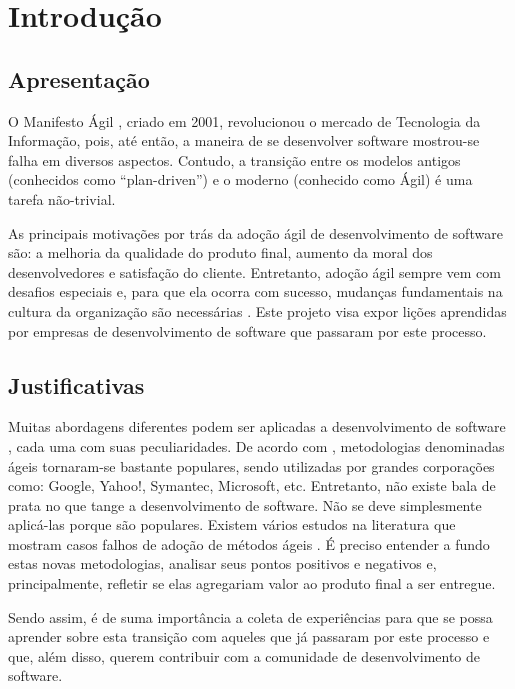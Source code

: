 \chapter{Introdução}

\section{Apresentação}

O Manifesto Ágil \cite{agileManifesto}, criado em 2001, revolucionou o mercado de Tecnologia da Informação, pois, até então, a maneira de se desenvolver software mostrou-se falha em diversos aspectos. Contudo, a transição entre os modelos antigos (conhecidos como “plan-driven”) e o moderno (conhecido como Ágil) é uma tarefa não-trivial.

As principais motivações por trás da adoção ágil de desenvolvimento de software são: a melhoria da qualidade do produto final, aumento da moral dos desenvolvedores e satisfação do cliente. Entretanto, adoção ágil sempre vem com desafios especiais e, para que ela ocorra com sucesso, mudanças fundamentais na cultura da organização são necessárias \cite{Hajjdiab2011}. Este projeto visa expor lições aprendidas por empresas de desenvolvimento de software que passaram por este processo.

\section{Justificativas}

Muitas abordagens diferentes podem ser aplicadas a desenvolvimento de software \cite{Kettunen2010}, cada uma com suas peculiaridades. De acordo com \cite{Shore2007}, metodologias denominadas ágeis tornaram-se bastante populares, sendo utilizadas por grandes corporações como: Google, Yahoo!, Symantec, Microsoft, etc. Entretanto, não existe bala de prata no que tange a desenvolvimento de software. Não se deve simplesmente aplicá-las porque são populares. Existem vários estudos na literatura que mostram casos falhos de adoção de métodos ágeis \cite{Krasteva2008}. É preciso entender a fundo estas novas metodologias, analisar seus pontos positivos e negativos e, principalmente, refletir se elas agregariam valor ao produto final a ser entregue.

Sendo assim, é de suma importância a coleta de experiências para que se possa aprender sobre esta transição com aqueles que já passaram por este processo e que, além disso, querem contribuir com a comunidade de desenvolvimento de software.

